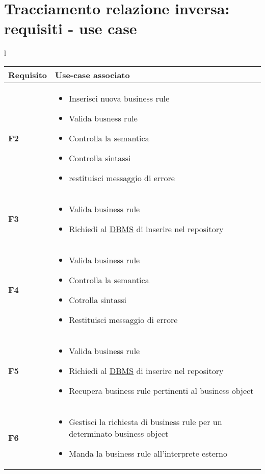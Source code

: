 \section{Tracciamento relazione inversa: requisiti - use case}
\large{
\begin{tabular}{l}
\begin{tabular}{||p{2cm}||p{10cm}||} \hline
\textbf{Requisito} & \textbf{Use-case associato} \\ \hline
\textbf {F2} & \begin{itemize}
\item Inserisci nuova business rule
\item Valida busness rule
\item Controlla la semantica
\item Controlla sintassi
\item restituisci messaggio di errore
\end{itemize} \\ \hline
\textbf{F3} & \begin{itemize}
\item Valida business rule
\item Richiedi al \underline{DBMS} di inserire nel repository
\end{itemize} \\ \hline
\textbf{F4} & \begin{itemize}
\item Valida business rule
\item Controlla la semantica
\item Cotrolla sintassi
\item Restituisci messaggio di errore
\end{itemize} \\ \hline
\textbf{F5} & \begin{itemize}
\item Valida business rule
\item Richiedi al \underline{DBMS} di inserire nel repository
\item Recupera business rule pertinenti al business object
\end{itemize} \\ \hline
\textbf{F6} & \begin{itemize}
\item Gestisci la richiesta di business rule per un determinato business object
\item Manda la business rule all'interprete esterno
\end{itemize} \\ \hline
\end{tabular}
\end{tabular}

}
